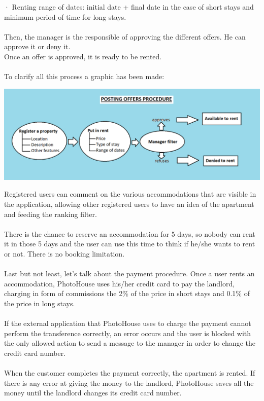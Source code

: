 \documentclass[12pt]{article}
\begin{document}
· Renting range of dates: initial date + final date in the case of short stays and minimum period of time for long stays.\\\\
Then, the manager is the responsible of approving the different offers. He can approve it or deny it.\\Once an offer is approved, it is ready to be rented.\\\\
To clarify all this process a graphic has been made:\\
\begin{center}
	\includegraphics[scale=0.8]{posting_procedure.png}
\end{center}
Registered users can comment on the various accommodations that are visible in the application, allowing other registered users to have an idea of the apartment and feeding the ranking filter.\\\\

There is the chance to reserve an accommodation for 5 days, so nobody can rent it in those 5 days and the user can use this time to think if he/she wants to rent or not. There is no booking limitation.\\\\

Last but not least, let's talk about the payment procedure. Once a user rents an accommodation, PhotoHouse uses his/her credit card to pay the landlord, charging in form of commissions the 2\% of the price in short stays and 0.1\% of the price in long stays.\\\\
If the external application that PhotoHouse uses to charge the payment cannot perform the transference correctly, an error occurs and the user is blocked with the only allowed action to send a message to the manager in order to change the credit card number.\\\\When the customer completes the payment correctly, the apartment is rented. If there is any error at giving the money to the landlord, PhotoHouse saves all the money until the landlord changes its credit card number.\\
\end{document}
